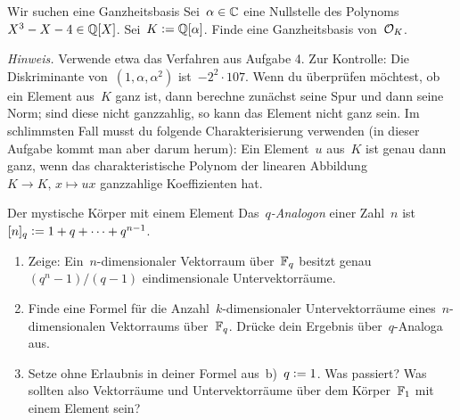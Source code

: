 \documentclass{uebblatt}
\begin{document}
\begin{aufgabe}{Wir suchen eine Ganzheitsbasis}
Sei~$\alpha \in \mathbb{C}$ eine Nullstelle des Polynoms~$X^3 - X - 4 \in \mathbb{Q}[X]$.
Sei~$K \vcentcolon= \mathbb{Q}[\alpha]$. Finde eine Ganzheitsbasis von~$\mathcal{O}_K$.

{\tiny\emph{Hinweis.} Verwende etwa das Verfahren aus Aufgabe 4. Zur Kontrolle:
Die Diskriminante von~$(1,\alpha,\alpha^2)$ ist~$-2^2 \cdot 107$. Wenn du
überprüfen möchtest, ob ein Element aus~$K$ ganz ist, dann berechne zunächst
seine Spur und dann seine Norm; sind diese nicht ganzzahlig, so kann das
Element nicht ganz sein. Im schlimmsten Fall musst du folgende
Charakterisierung verwenden (in dieser Aufgabe kommt man aber darum herum): Ein
Element~$u$ aus~$K$ ist genau dann ganz, wenn das charakteristische Polynom der
linearen Abbildung~$K \to K,\,x \mapsto ux$ ganzzahlige Koeffizienten hat.\par}
\end{aufgabe}

\begin{aufgabe*}{Der mystische Körper mit einem Element}
Das~\emph{$q$-Analogon} einer Zahl~$n$ ist~$[n]_q \vcentcolon= 1+q+\cdots+q^{n-1}$.
\begin{enumerate}
\item Zeige: Ein~$n$-dimensionaler Vektorraum über~$\mathbb{F}_q$ besitzt
genau~$(q^n-1)/(q-1)$ eindimensionale Untervektorräume.
\item Finde eine Formel für die Anzahl~$k$-dimensionaler Untervektorräume
eines~$n$-dimensionalen Vektorraums über~$\mathbb{F}_q$. Drücke dein Ergebnis
über~$q$-Analoga aus.
\item Setze ohne Erlaubnis in deiner Formel aus~b)~$q \vcentcolon= 1$. Was passiert?
Was sollten also Vektorräume und Untervektorräume über dem
Körper~$\mathbb{F}_1$ mit einem Element sein?
\end{enumerate}
\end{aufgabe*}
\end{document}
